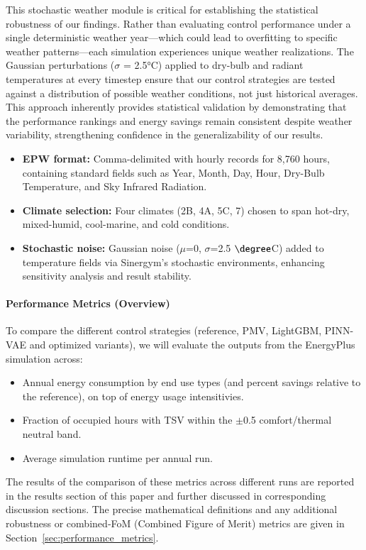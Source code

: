 This stochastic weather module is critical for establishing the statistical robustness of our findings. Rather than evaluating control performance under a single deterministic weather year—which could lead to overfitting to specific weather patterns—each simulation experiences unique weather realizations. The Gaussian perturbations ($\sigma$ = 2.5°C) applied to dry-bulb and radiant temperatures at every timestep ensure that our control strategies are tested against a distribution of possible weather conditions, not just historical averages. This approach inherently provides statistical validation by demonstrating that the performance rankings and energy savings remain consistent despite weather variability, strengthening confidence in the generalizability of our results.
\begin{itemize}
  \item \textbf{EPW format:} Comma-delimited with hourly records for 8,760 hours, containing standard fields such as Year, Month, Day, Hour, Dry-Bulb Temperature, and Sky Infrared Radiation\cite{EPW_Format}.
  \item \textbf{Climate selection:} Four climates (2B, 4A, 5C, 7) chosen to span hot-dry, mixed-humid, cool-marine, and cold conditions.
  \item \textbf{Stochastic noise:} Gaussian noise ($\mu$=0, $\sigma$=2.5 $\degree$C) added to temperature fields via Sinergym’s stochastic environments\cite{Sinergym_Stochastic}, enhancing sensitivity analysis and result stability.
\end{itemize}

\paragraph{Performance Metrics (Overview)}
To compare the different control strategies (reference, PMV, LightGBM, PINN-VAE and optimized variants), we will evaluate the outputs from the EnergyPlus simulation across:  
\begin{itemize}
  \item Annual energy consumption by end use types (and percent savings relative to the reference), on top of energy usage intensitivies.  
  \item Fraction of occupied hours with TSV within the $\pm$0.5 comfort/thermal neutral band.  
  \item Average simulation runtime per annual run.  
\end{itemize}
The results of the comparison of these metrics across different runs are reported in the results section of this paper and further discussed in corresponding discussion sections.%
The precise mathematical definitions and any additional robustness or combined‐FoM (Combined Figure of Merit) metrics are given in Section~\ref{sec:performance_metrics}.%


